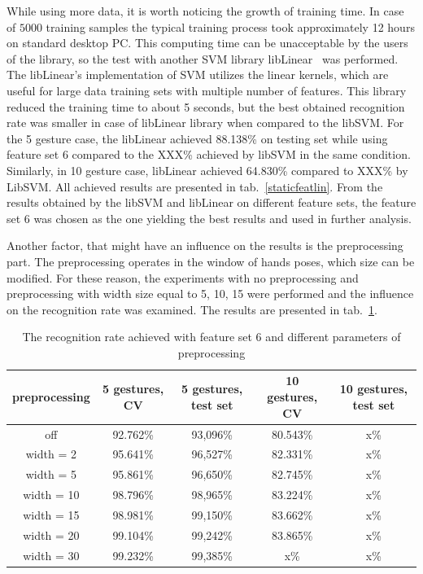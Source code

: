While using more data, it is worth noticing the growth of training time. 
In case of $5000$ training samples the typical training process took approximately 12 hours on standard desktop PC. 
This computing time can be unacceptable by the users of the library, so the test with another SVM library libLinear~\cite{libLinear} was performed. 
The libLinear's implementation of SVM utilizes the linear kernels, which are useful for large data training sets with multiple number of features. 
This library reduced the training time to about 5 seconds, but the best obtained recognition rate was smaller in case of libLinear library when compared to the libSVM.
For the 5 gesture case, the libLinear achieved 88.138\% on testing set while using feature set 6 compared to the XXX\% achieved by libSVM in the same condition.
Similarly, in 10 gesture case, libLinear achieved 64.830\% compared to XXX\% by LibSVM.
All achieved results are presented in tab.~\ref{staticfeatlin}.
From the results obtained by the libSVM and libLinear on different feature sets, the feature set 6 was chosen as the one yielding the best results and used in further analysis.

Another factor, that might have an influence on the results is the preprocessing part. 
The preprocessing operates in the window of hands poses, which size can be modified. 
For these reason, the experiments with no preprocessing and preprocessing with width size equal to 5, 10, 15 were performed and the influence on the recognition rate was examined.
The results are presented in tab.~\ref{staticpre}.


\begin{table}[htp!]
\begin{center}
	\label{staticpre}
	\caption{The recognition rate achieved with feature set 6 and different parameters of preprocessing}
    \begin{tabular}{|c|c|c|c|c|}
    \hline
    preprocessing                                                   & 5 gestures, CV & 5 gestures, test set & 10 gestures, CV  & 10 gestures, test set \\ \hline
    off                     & 92.762\% & 93,096\%  & 80.543\% & x\% \\ \hline
    width = 2               & 95.641\% & 96,527\%  & 82.331\% & x\% \\ \hline
    width = 5               & 95.861\% & 96,650\%  & 82.745\% & x\% \\ \hline
    width = 10              & 98.796\% & 98,965\%  & 83.224\% & x\% \\ \hline
    width = 15              & 98.981\% & 99,150\%  & 83.662\% & x\% \\ \hline
    width = 20              & 99.104\% & 99,242\%  & 83.865\% & x\% \\ \hline
    width = 30              & 99.232\% & 99,385\%  & x\% & x\% \\ \hline
    \end{tabular}
    \end{center}
\end{table}

